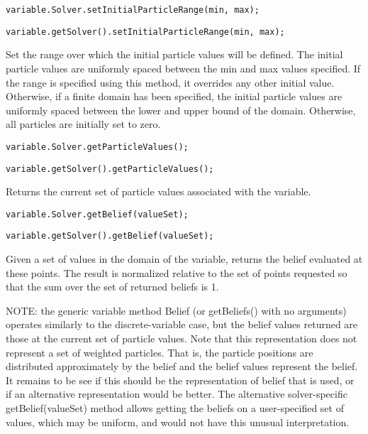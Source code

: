\ifmatlab
\begin{lstlisting}
variable.Solver.setInitialParticleRange(min, max);
\end{lstlisting}
\fi

\ifjava
\begin{lstlisting}
variable.getSolver().setInitialParticleRange(min, max);
\end{lstlisting}
\fi

Set the range over which the initial particle values will be defined. The initial particle values are uniformly spaced between the min and max values specified. If the range is specified using this method, it overrides any other initial value. Otherwise, if a finite domain has been specified, the initial particle values are uniformly spaced between the lower and upper bound of the domain. Otherwise, all particles are initially set to zero.

\ifmatlab
\begin{lstlisting}
variable.Solver.getParticleValues();
\end{lstlisting}
\fi

\ifjava
\begin{lstlisting}
variable.getSolver().getParticleValues();
\end{lstlisting}
\fi

Returns the current set of particle values associated with the variable.

\ifmatlab
\begin{lstlisting}
variable.Solver.getBelief(valueSet);
\end{lstlisting}
\fi

\ifjava
\begin{lstlisting}
variable.getSolver().getBelief(valueSet);
\end{lstlisting}
\fi

Given a set of values in the domain of the variable, returns the belief evaluated at these points. The result is normalized relative to the set of points requested so that the sum over the set of returned beliefs is 1.

NOTE: the generic variable method Belief (or getBeliefs() with no arguments) operates similarly to the discrete-variable case, but the belief values returned are those at the current set of particle values. Note that this representation does not represent a set of weighted particles. That is, the particle positions are distributed approximately by the belief and the belief values represent the belief. It remains to be see if this should be the representation of belief that is used, or if an alternative representation would be better. The alternative solver-specific getBelief(valueSet) method allows getting the beliefs on a user-specified set of values, which may be uniform, and would not have this unusual interpretation.



